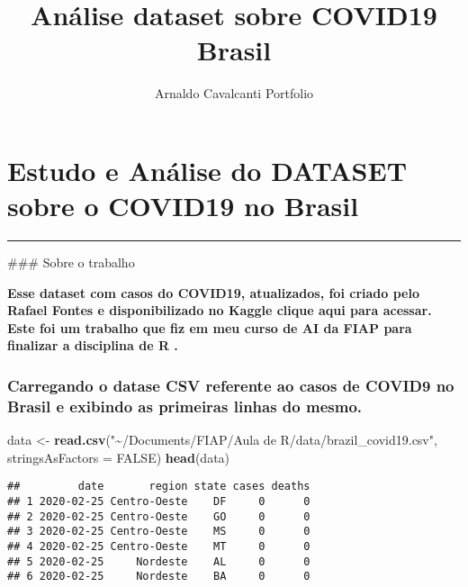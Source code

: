 \documentclass[
]{article}
\title{Análise dataset sobre COVID19 Brasil}
\author{Arnaldo Cavalcanti Portfolio}
\date{}
\newenvironment{Shaded}{\begin{snugshade}}{\end{snugshade}}
\newcommand{\DataTypeTok}[1]{\textcolor[rgb]{0.13,0.29,0.53}{#1}}
\newcommand{\KeywordTok}[1]{\textcolor[rgb]{0.13,0.29,0.53}{\textbf{#1}}}
\newcommand{\NormalTok}[1]{#1}
\newcommand{\OtherTok}[1]{\textcolor[rgb]{0.56,0.35,0.01}{#1}}
\newcommand{\StringTok}[1]{\textcolor[rgb]{0.31,0.60,0.02}{#1}}
\begin{document}
\maketitle

\hypertarget{estudo-e-anuxe1lise-do-dataset-sobre-o-covid19-no-brasil}{%
\section{Estudo e Análise do DATASET sobre o COVID19 no
Brasil}\label{estudo-e-anuxe1lise-do-dataset-sobre-o-covid19-no-brasil}}

\begin{center}\rule{0.5\linewidth}{0.5pt}\end{center}

\#\#\# Sobre o trabalho

\textbf{Esse dataset com casos do COVID19, atualizados, foi criado pelo
Rafael Fontes e disponibilizado no Kaggle clique aqui para acessar. Este
foi um trabalho que fiz em meu curso de AI da FIAP para finalizar a
disciplina de R .}

\hypertarget{carregando-o-datase-csv-referente-ao-casos-de-covid9-no-brasil-e-exibindo-as-primeiras-linhas-do-mesmo.}{%
\subsubsection{Carregando o datase CSV referente ao casos de COVID9 no
Brasil e exibindo as primeiras linhas do
mesmo.}\label{carregando-o-datase-csv-referente-ao-casos-de-covid9-no-brasil-e-exibindo-as-primeiras-linhas-do-mesmo.}}

\begin{Shaded}
\begin{Highlighting}[]
\NormalTok{data \textless{}{-}}\StringTok{ }\KeywordTok{read.csv}\NormalTok{(}\StringTok{"\textasciitilde{}/Documents/FIAP/Aula de R/data/brazil\_covid19.csv"}\NormalTok{, }\DataTypeTok{stringsAsFactors =} \OtherTok{FALSE}\NormalTok{)}
\KeywordTok{head}\NormalTok{(data)}
\end{Highlighting}
\end{Shaded}

\begin{verbatim}
##         date       region state cases deaths
## 1 2020-02-25 Centro-Oeste    DF     0      0
## 2 2020-02-25 Centro-Oeste    GO     0      0
## 3 2020-02-25 Centro-Oeste    MS     0      0
## 4 2020-02-25 Centro-Oeste    MT     0      0
## 5 2020-02-25     Nordeste    AL     0      0
## 6 2020-02-25     Nordeste    BA     0      0
\end{verbatim}
\end{document}

